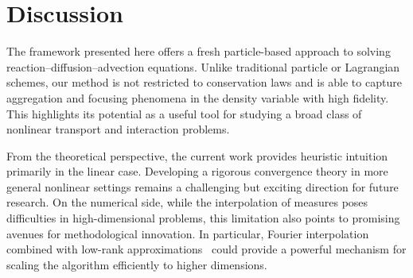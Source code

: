 \documentclass[preprint,12pt]{elsarticle}
\theoremstyle{definition}
\theoremstyle{remark}
\begin{document}
\section{Discussion}
The framework presented here offers a fresh particle-based approach to solving reaction–diffusion--advection equations. Unlike traditional particle or Lagrangian schemes, our method is not restricted to conservation laws and is able to capture aggregation and focusing phenomena in the density variable with high fidelity. This highlights its potential as a useful tool for studying a broad class of nonlinear transport and interaction problems.

From the theoretical perspective, the current work provides heuristic intuition primarily in the linear case. Developing a rigorous convergence theory in more general nonlinear settings remains a challenging but exciting direction for future research. On the numerical side, while the interpolation of measures poses difficulties in high-dimensional problems, this limitation also points to promising avenues for methodological innovation. In particular, Fourier interpolation combined with low-rank approximations~\cite{tang2025solving} could provide a powerful mechanism for scaling the algorithm efficiently to higher dimensions.




\end{document}
